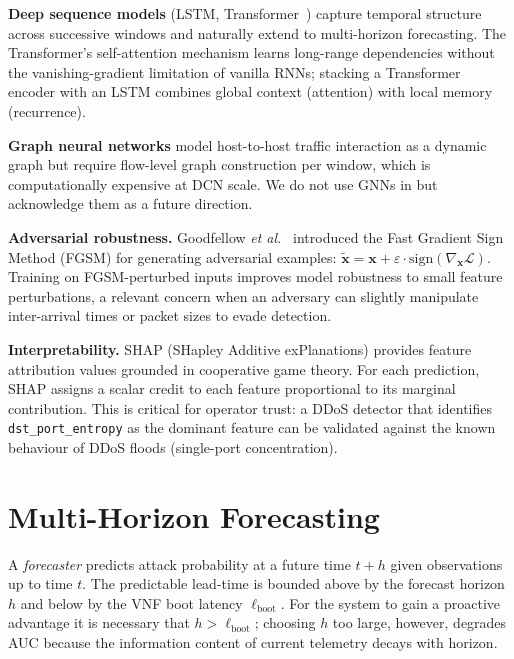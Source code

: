 \textbf{Deep sequence models} (LSTM, Transformer~\citep{vaswani2017attention})
capture temporal structure across successive windows and naturally extend
to multi-horizon forecasting. The Transformer's self-attention mechanism
learns long-range dependencies without the vanishing-gradient limitation
of vanilla RNNs; stacking a Transformer encoder with an LSTM combines
global context (attention) with local memory (recurrence).

\textbf{Graph neural networks} model host-to-host traffic interaction as a
dynamic graph but require flow-level graph construction per window, which
is computationally expensive at DCN scale. We do not use GNNs in \padonap{}
but acknowledge them as a future direction.

\textbf{Adversarial robustness.} Goodfellow \textit{et al.}~\citep{goodfellow2015fgsm}
introduced the Fast Gradient Sign Method (FGSM) for generating adversarial
examples: $\tilde{\mathbf{x}} = \mathbf{x} + \varepsilon \cdot
\text{sign}(\nabla_{\mathbf{x}} \mathcal{L})$. Training on FGSM-perturbed
inputs improves model robustness to small feature perturbations, a
relevant concern when an adversary can slightly manipulate inter-arrival
times or packet sizes to evade detection.

\textbf{Interpretability.} SHAP (SHapley Additive exPlanations)
\citep{lundberg2017shap} provides feature attribution values grounded in
cooperative game theory. For each prediction, SHAP assigns a scalar
credit to each feature proportional to its marginal contribution. This
is critical for operator trust: a DDoS detector that identifies
\texttt{dst\_port\_entropy} as the dominant feature can be validated
against the known behaviour of DDoS floods (single-port concentration).

\section{Multi-Horizon Forecasting}
\label{sec:forecast-bg}

A \emph{forecaster} predicts attack probability at a future time
$t + h$ given observations up to time $t$. The predictable lead-time is
bounded above by the forecast horizon $h$ and below by the VNF boot
latency $\ell_{\text{boot}}$. For the system to gain a proactive
advantage it is necessary that $h > \ell_{\text{boot}}$; choosing $h$
too large, however, degrades AUC because the information content of
current telemetry decays with horizon.

